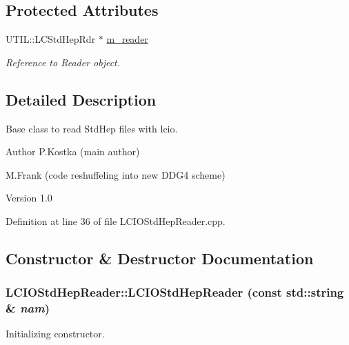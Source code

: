 \subsection*{Protected Attributes}
\begin{DoxyCompactItemize}
\item 
UTIL::LCStdHepRdr $\ast$ \hyperlink{class_d_d4hep_1_1_simulation_1_1_l_c_i_o_std_hep_reader_a6545b15d1a2012ef556e97c33df91a98}{m\_\-reader}
\begin{DoxyCompactList}\small\item\em Reference to Reader object. \item\end{DoxyCompactList}\end{DoxyCompactItemize}


\subsection{Detailed Description}
Base class to read StdHep files with lcio. \begin{DoxyAuthor}{Author}
P.Kostka (main author) 

M.Frank (code reshuffeling into new DDG4 scheme) 
\end{DoxyAuthor}
\begin{DoxyVersion}{Version}
1.0 
\end{DoxyVersion}


Definition at line 36 of file LCIOStdHepReader.cpp.

\subsection{Constructor \& Destructor Documentation}
\hypertarget{class_d_d4hep_1_1_simulation_1_1_l_c_i_o_std_hep_reader_ae877c907bf826120cc697aa80a39aba7}{
\subsubsection[{LCIOStdHepReader}]{\setlength{\rightskip}{0pt plus 5cm}LCIOStdHepReader::LCIOStdHepReader (const std::string \& {\em nam})}}
\label{class_d_d4hep_1_1_simulation_1_1_l_c_i_o_std_hep_reader_ae877c907bf826120cc697aa80a39aba7}


Initializing constructor. 

